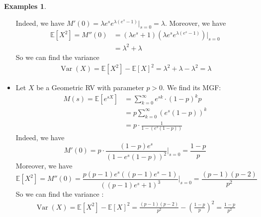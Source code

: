 \documentclass[paper=a4, fontsize=12pt]{scrartcl} %
\newcommand{\bra}[1]{\left(#1\right)}
\theoremstyle{definition}
\newtheorem{exmps}[thm]{Examples}
\theoremstyle{remark}
\newcommand{\E}{\mathbb{E}}
\DeclareMathOperator{\vari}{Var}
\numberwithin{equation}{section} %
\numberwithin{figure}{section} %
\numberwithin{table}{section} %
\begin{document}
\begin{exmps}
\begin{itemize}
		Indeed, we have $M'(0) = \lambda e^s e^{\lambda(e^s-1)} \vert_{s=0} = \lambda$. Moreover, we have 
		\begin{align*}
		\E[X^2] = M''(0) &= (\lambda e^s + 1)(\lambda e^s e^{\lambda(e^s-1)}) \vert_{s=0}\\
		&= \lambda^2 + \lambda
		\end{align*}
		So we can find the variance
		\begin{align*}
		\vari(X) = \E[X^2]-\E[X]^2 = \lambda^2+\lambda -\lambda^2 = \lambda 
		\end{align*}
		\item Let $X$ be a Geometric RV with parameter $p > 0$. We find its MGF:
		\begin{align*}
		M(s) = \E[e^{sX}] &= \sum_{k=0}^{\infty} e^{sk}\cdot(1-p)^kp\\
		&=p\sum_{k=0}^{\infty} (e^{s}(1-p))^k\\
		&= p \cdot \frac{1}{1-(e^{s}(1-p))}
		\end{align*}
		Indeed, we have
		\[M'(0) = p\cdot \frac{(1-p)e^s}{(1-e^s(1-p))^2}\vert_{s=0} = \frac{1-p}{p} \]
		Moreover, we have 
		\[\E[X^2] = M''(0) = \frac{p(p - 1) e^s ((p - 1) e^s - 1)}{((p - 1) e^s + 1)^3} \vert_{s=0} = \frac{(p-1)(p-2)}{p^2}\]
		So we can find the variance :
		\begin{align*}
		\vari(X) = \E[X^2]-\E[X]^2 = \frac{(p-1)(p-2)}{p^2} -\bra{\frac{1-p}{p}}^2 = \frac{1-p}{p^2}
		\end{align*}
	\end{itemize}
\end{exmps}
\end{document}
